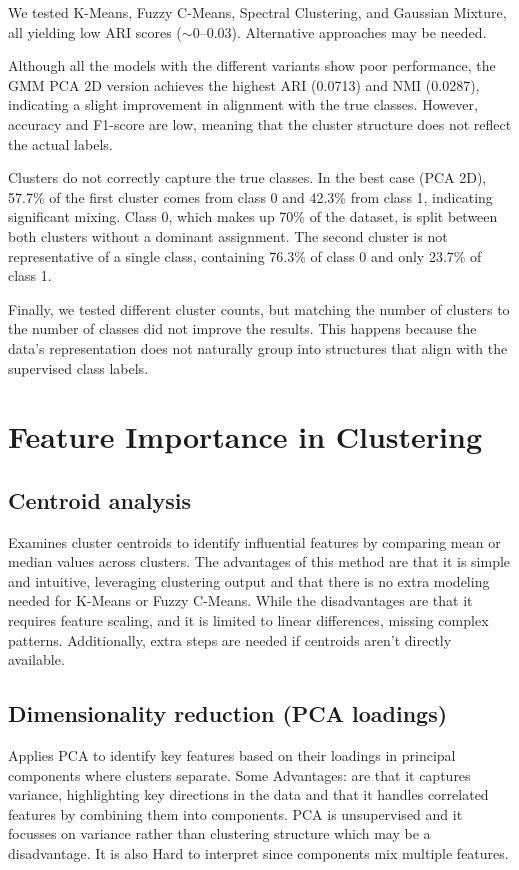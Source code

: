 \documentclass[11pt,a4paper]{article}
\begin{document}
We tested K-Means, Fuzzy C-Means, Spectral Clustering, and Gaussian Mixture, all yielding low ARI scores ($\sim$0--0.03). Alternative approaches may be needed.

Although all the models with the different variants show poor performance, the GMM PCA 2D version achieves the highest ARI (0.0713) and NMI (0.0287), indicating a slight improvement in alignment with the true classes. However, accuracy and F1-score are low, meaning that the cluster structure does not reflect the actual labels.

Clusters do not correctly capture the true classes. In the best case (PCA 2D), 57.7\% of the first cluster comes from class 0 and 42.3\% from class 1, indicating significant mixing. Class 0, which makes up 70\% of the dataset, is split between both clusters without a dominant assignment. The second cluster is not representative of a single class, containing 76.3\% of class 0 and only 23.7\% of class 1.

Finally, we tested different cluster counts, but matching the number of clusters to the number of classes did not improve the results. This happens because the data's representation does not naturally group into structures that align with the supervised class labels.

\section{Feature Importance in Clustering}

\subsection{Centroid analysis}
Examines cluster centroids to identify influential features by comparing mean or median values across clusters. The advantages of this method are that it is simple and intuitive, leveraging clustering output and that there is no extra modeling needed for K-Means or Fuzzy C-Means. While the disadvantages are that it requires feature scaling, and it is limited to linear differences, missing complex patterns. Additionally, extra steps are needed if centroids aren't directly available.

\subsection{Dimensionality reduction (PCA loadings)}
Applies PCA to identify key features based on their loadings in principal components where clusters separate. Some Advantages: are that it captures variance, highlighting key directions in the data and that it handles correlated features by combining them into components. PCA is unsupervised and it focusses on variance rather than clustering structure which may be a disadvantage. It is also Hard to interpret since components mix multiple features.
\end{document}
